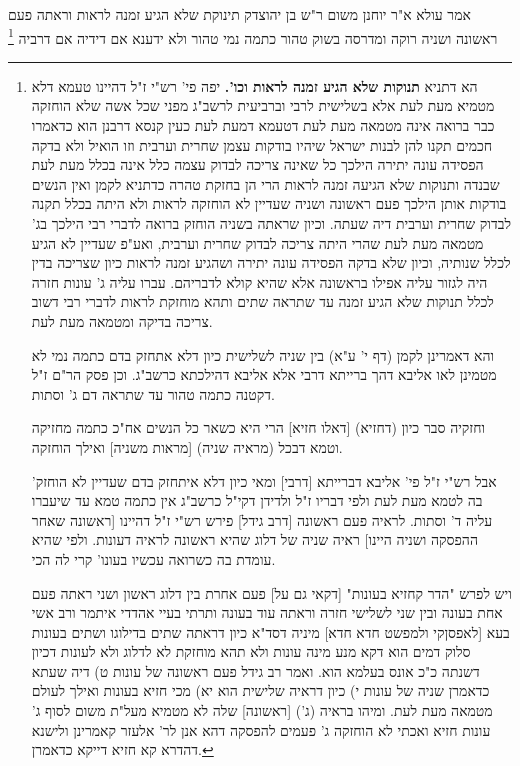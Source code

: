 \documentclass[12pt, openany]{book}
\newcommand{\footnotecomment}[1]{\footnote{#1}}
\newcommand{\commenta}[1]{\footnotecomment{#1}}
\begin{document}
{אמר עולא א"ר יוחנן משום ר"ש בן יהוצדק  תינוקת שלא הגיע זמנה לראות וראתה פעם ראשונה ושניה רוקה ומדרסה בשוק טהור כתמה נמי טהור ולא ידענא אם דידיה אם דרביה 
\commenta{ הא דתניא \textbf{תנוקות שלא הגיע זמנה לראות וכו'.}  יפה פי' רש"י ז"ל דהיינו טעמא דלא מטמיא מעת לעת אלא בשלישית לרבי וברביעית לרשב"ג מפני שכל אשה שלא הוחזקה כבר ברואה אינה מטמאה מעת לעת דטעמא דמעת לעת כעין קנסא דרבנן הוא כדאמרו חכמים תקנו להן לבנות ישראל שיהיו בודקות עצמן שחרית וערבית וזו הואיל ולא בדקה הפסידה עונה יתירה הילכך כל שאינה צריכה לבדוק עצמה כלל אינה בכלל מעת לעת שבנדה ותנוקות שלא הגיעה זמנה לראות הרי הן בחזקת טהרה כדתניא לקמן ואין הנשים בודקות אותן הילכך פעם ראשונה ושניה שעדיין לא הוחזקה לראות ולא היתה בכלל תקנה לבדוק שחרית וערבית דיה שעתה. וכיון שראתה בשניה הוחזק ברואה לדברי רבי הילכך בג' מטמאה מעת לעת שהרי היתה צריכה לבדוק שחרית וערבית, ואע"פ שעדיין לא הגיע לכלל שנותיה, וכיון שלא בדקה הפסידה עונה יתירה ושהגיע זמנה לראות כיון שצריכה בדין היה לגזור עליה אפילו בראשונה אלא שהיא קולא לדבריהם. עברו עליה ג' עונות חזרה לכלל תנוקות שלא הגיע זמנה עד שתראה שתים ותהא מוחזקת לראות לדברי רבי דשוב צריכה בדיקה ומטמאה מעת לעת.\par  והא דאמרינן לקמן (דף י' ע"א) בין שניה לשלישית כיון דלא אתחזק בדם כתמה נמי לא מטמינן לאו אליבא דהך ברייתא דרבי אלא אליבא דהילכתא כרשב"ג. וכן פסק הר"ם ז"ל דקטנה כתמה טהור עד שתראה דם ג' וסתות.\par  וחזקיה סבר כיון (דחזיא) [דאלו חזיא] הרי היא כשאר כל הנשים אח"כ כתמה מחזיקה וטמא דבכל (מראיה שניה) [מראות משניה] ואילך הוחזקה.\par  אבל רש"י ז"ל פי' אליבא דברייתא [דרבי] ומאי כיון דלא איתחזק בדם שעדיין לא הוחזק' בה לטמא מעת לעת ולפי דבריו ז"ל ולדידן דקי"ל כרשב"ג אין כתמה טמא עד שיעברו עליה ד' וסתות. לראיה פעם ראשונה [דרב גידל] פירש רש"י ז"ל דהיינו [ראשונה שאחר ההפסקה ושניה היינו] ראיה שניה של דלוג שהיא ראשונה לראיה דעונות. ולפי שהיא עומדת בה כשרואה עכשיו בעונו' קרי לה הכי.\par  ויש לפרש "הדר קחזיא בעונות" [דקאי גם על] פעם אחרת בין דלוג ראשון ושני ראתה פעם אחת בעונה ובין שני לשלישי חזרה וראתה עוד בעונה ותרתי בעיי אהדדי איתמר ורב אשי בעא [לאפסןקי ולמפשט חדא חדא] מיניה דסד"א כיון דראתה שתים בדילוגו ושתים בעונות סלוק דמים הוא דקא מנע מינה עונות ולא תהא מוחזקת לא לדלוג ולא לעונות דכיון דשנתה כ"כ אונס בעלמא הוא. ואמר רב גידל פעם ראשונה של עונות ט) דיה שעתא כדאמרן שניה של עונות י) כיון דראיה שלישית הוא יא) מכי חזיא בעונות ואילך לעולם מטמאה מעת לעת. ומיהו בראיה (ג') [ראשונה] שלה לא מטמיא מעל"ת משום לסוף ג' עונות חזיא ואכתי לא הוחזקה ג' פעמים להפסקה דהא אנן לר' אלעזר קאמרינן ולישנא דהדרא קא חזיא דייקא כדאמרן. }

}
\end{document}
